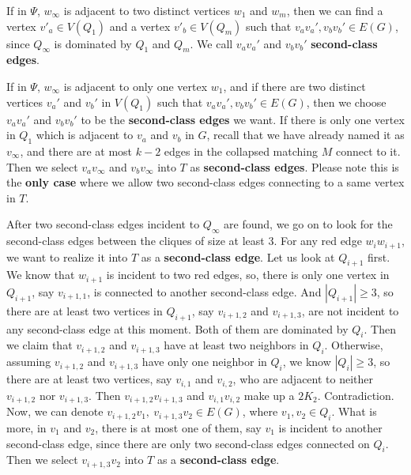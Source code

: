 \documentclass[12pt]{article}
\begin{document}
If in $\Psi$, $w_{\infty}$ is adjacent to two distinct vertices $w_1$ and $w_m$, then we can find a vertex $v'_a\in V(Q_1)$ and a vertex $v'_b\in V(Q_m)$ such that $v_av_a',v_bv_b'\in E(G)$, since $Q_{\infty}$ is dominated by $Q_1$ and $Q_m$. We call $v_av_a'$ and $v_bv_b'$ {\bf second-class edges}.

If in $\Psi$, $w_{\infty}$ is adjacent to only one vertex $w_1$, and if there are two distinct vertices $v_a'$ and $v_b'$ in $V(Q_1)$ such that $v_av_a',v_bv_b'\in E(G)$, then we choose $v_av_a'$ and $v_bv_b'$ to be the {\bf second-class edges} we want. If there is only one vertex in $Q_1$ which is adjacent to $v_a$ and $v_b$ in $G$, recall that we have already named it as $v_{\infty}$, and there are at most $k-2$ edges in the collapsed matching $M$ connect to it. Then we select $v_av_{\infty}$ and $v_bv_{\infty}$ into $T$ as {\bf second-class edges}. Please note this is the {\bf only case} where we allow two second-class edges connecting to a same vertex in $T$.





After two second-class edges incident to $Q_{\infty}$ are found, we go on to look for the second-class edges between the cliques of size at least 3.
For any red edge $w_iw_{i+1}$, we want to realize it into $T$ as a {\bf second-class edge}. Let us look at $Q_{i+1}$ first. We know that $w_{i+1}$ is incident to two red edges, so, there is only one vertex in $Q_{i+1}$, say $v_{i+1,1}$, is connected to another second-class edge. And $|Q_{i+1}|\ge3$, so there are at least two vertices in $Q_{i+1}$, say $v_{i+1,2}$ and $v_{i+1,3}$, are not incident to any second-class edge at this moment. Both of them are dominated by $Q_i$. Then we claim that $v_{i+1,2}$ and $v_{i+1,3}$ have at least two neighbors in $Q_i$. Otherwise, assuming $v_{i+1,2}$ and $v_{i+1,3}$ have only one neighbor in $Q_i$, we know $|Q_i|\ge3$, so there are at least two vertices, say $v_{i,1}$ and $v_{i,2}$, who are adjacent to neither $v_{i+1,2}$ nor $v_{i+1,3}$. Then $v_{i+1,2}v_{i+1,3}$ and $v_{i,1}v_{i,2}$ make up a $2K_2$. Contradiction. Now, we can denote $v_{i+1,2}v_1,~v_{i+1,3}v_2\in E(G)$, where $v_1,v_2\in Q_i$. What is more, in $v_1$ and $v_2$, there is at most one of them, say $v_1$ is incident to another second-class edge, since there are only two second-class edges connected on $Q_i$. Then we select $v_{i+1,3}v_2$ into $T$ as a {\bf second-class edge}.
\end{document}
